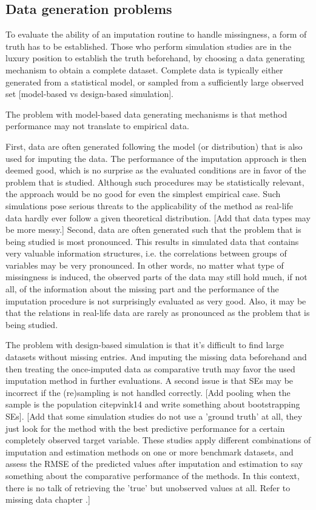 \documentclass[bimj,fleqn]{w-art}
\theoremstyle{plain}
\theoremstyle{definition}
\begin{document}

\subsection{Data generation problems}

To evaluate the ability of an imputation routine to handle missingness, a form of truth has to be established. Those who perform simulation studies are in the luxury position to establish the truth beforehand, by choosing a data generating mechanism to obtain a complete dataset. Complete data is typically either generated from a statistical model, or sampled from a sufficiently large observed set [model-based vs design-based simulation]. 

The problem with model-based data generating mechanisms is that method performance may not translate to empirical data. 

First, data are often generated following the model (or distribution) that is also used for imputing the data. The performance of the imputation approach is then deemed good, which is no surprise as the evaluated conditions are in favor of the problem that is studied. Although such procedures may be statistically relevant, the approach would be no good for even the simplest empirical case. Such simulations pose serious threats to the applicability of the method as real-life data hardly ever follow a given theoretical distribution. [Add that data types may be more messy.] Second, data are often generated such that the problem that is being studied is most pronounced. This results in simulated data that contains very valuable information structures, i.e. the correlations between groups of variables may be very pronounced. In other words, no matter what type of missingness is induced, the observed parts of the data may still hold much, if not all, of the information about the missing part and the performance of the imputation procedure is not surprisingly evaluated as very good. Also, it may be that the relations in real-life data are rarely as pronounced as the problem that is being studied.

The problem with design-based simulation is that it's difficult to find large datasets without missing entries. And imputing the missing data beforehand and then treating the once-imputed data as comparative truth may favor the used imputation method in further evaluations. A second issue is that SEs may be incorrect if the (re)sampling is not handled correctly. [Add pooling when the sample is the population citep{vink14} and write something about bootstrapping SEs]. [Add that some simulation studies do not use a 'ground truth' at all, they just look for the method with the best predictive performance for a certain completely observed target variable. These studies apply different combinations of imputation and estimation methods on one or more benchmark datasets, and assess the RMSE of the predicted values after imputation and estimation to say something about the comparative performance of the methods. In this context, there is no talk of retrieving the 'true' but unobserved values at all. Refer to missing data chapter \citep{liu21}.]
\end{document}
